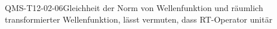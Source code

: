 
\begin{PROP}{QMS-T12-02-06}{Gleichheit der Norm von Wellenfunktion und räumlich transformierter Wellenfunktion, lässt vermuten, dass RT-Operator unitär}
\end{PROP}
